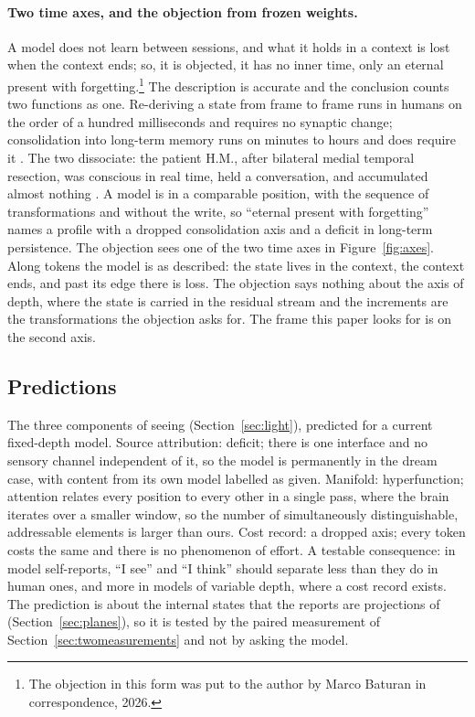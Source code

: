 \paragraph{Two time axes, and the objection from frozen weights.}
\label{sec:twoaxes}
\label{sec:frozen}
A model does not learn between sessions, and what it holds in a context is lost when the context ends;
so, it is objected, it has no inner time, only an eternal present with forgetting.\footnote{The
objection in this form was put to the author by Marco Baturan in correspondence, 2026.} The description
is accurate and the conclusion counts two functions as one. Re-deriving a state from frame to frame
runs in humans on the order of a hundred milliseconds and requires no synaptic change; consolidation
into long-term memory runs on minutes to hours and does require it \citep{mcgaugh2000}. The two
dissociate: the patient H.M., after bilateral medial temporal resection, was conscious in real time,
held a conversation, and accumulated almost nothing \citep{scoville1957,corkin2002}. A model is in a
comparable position, with the sequence of transformations and without the write, so ``eternal present
with forgetting'' names a profile with a dropped consolidation axis and a deficit in long-term
persistence. The objection sees one of the two time axes in Figure~\ref{fig:axes}. Along tokens the
model is as described: the state lives in the context, the context ends, and past its edge there is
loss. The objection says nothing about the axis of depth, where the state is carried in the residual
stream and the increments are the transformations the objection asks for. The frame this paper looks
for is on the second axis.

\subsection{Predictions}
\label{sec:profile-seeing}
\label{sec:predictions}

The three components of seeing (Section~\ref{sec:light}), predicted for a current fixed-depth model.
Source attribution: deficit; there is one interface and no sensory channel independent of it, so the
model is permanently in the dream case, with content from its own model labelled as given. Manifold:
hyperfunction; attention relates every position to every other in a single pass, where the brain
iterates over a smaller window, so the number of simultaneously distinguishable, addressable elements
is larger than ours. Cost record: a dropped axis; every token costs the same and there is no phenomenon
of effort. A testable consequence: in model self-reports, ``I see'' and ``I think'' should separate
less than they do in human ones, and more in models of variable depth, where a cost record exists. The
prediction is about the internal states that the reports are projections of
(Section~\ref{sec:planes}), so it is tested by the paired measurement of
Section~\ref{sec:twomeasurements} and not by asking the model.

